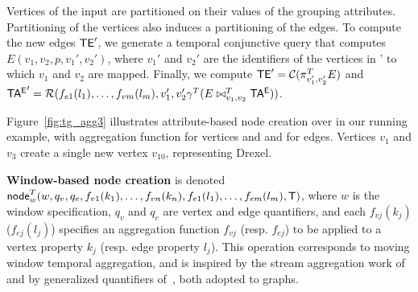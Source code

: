 Vertices of the input are partitioned on their values of the grouping
attributes.  Partitioning of the vertices also induces a partitioning
of the edges. To compute the new edges $\textsf{TE}'$, we generate a temporal
conjunctive query that computes $E(v_1,v_2,p,v_1',v_2')$, where $v_1'$
and $v_2'$ are the identifiers of the vertices in \tv' to which $v_1$
and $v_2$ are mapped.  Finally, we compute $\textsf{TE}' =
\mathcal{C}(\pi^T_{v_1',v_2'}E)$ and\\ $\mathsf{TA^{E}}' =
\mathcal{R}(f_{e1}(l_1),\ldots,f_{vm}(l_m),v_1',v_2' \gamma^T (E
  \bowtie^T_{v_1,v_2} \mathsf{TA^{E}}))$.

Figure~\ref{fig:tg_agg3} illustrates attribute-based node creation
over  in our running example, with 
aggregation function for vertices and and  for edges.
Vertices $v_1$ and $v_3$ create a single new vertex $v_{10}$,
representing Drexel.

{\bf Window-based node creation} is denoted\\
$\textsf{node}^T_w(w,q_v,q_e,f_{v1}(k_1),\ldots,f_{vn}(k_n),f_{e1}(l_1),\ldots,f_{em}(l_m),\mathsf{T})$,
where $w$ is the window specification, $q_v$ and $q_e$ are vertex and
edge quantifiers, and each $f_{vj}(k_j)$ ($f_{ej}(l_j)$) specifies an
aggregation function $f_{vj}$ (resp. $f_{ej}$) to be applied to a
vertex property $k_j$ (resp. edge property $l_j$).  This operation
corresponds to moving window temporal aggregation, and is inspired by
the stream aggregation work of~\cite{Li2005} and by generalized
quantifiers of~\cite{Hsu1995}, both adopted to graphs.



